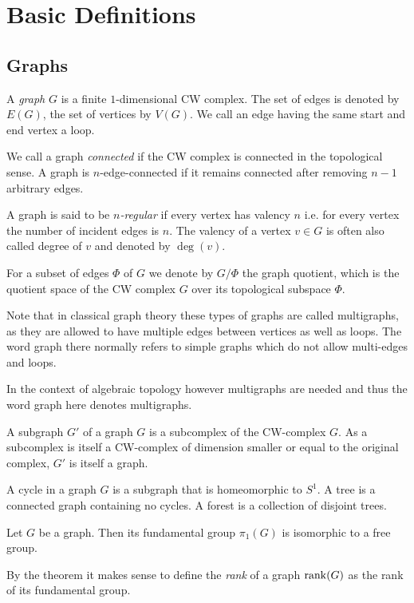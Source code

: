 \section{Basic Definitions}
\subsection{Graphs}
\begin{definition}
	A \emph{graph} $G$ is a finite $1$-dimensional CW complex. The set of edges is denoted by $E(G)$, the set of vertices by  $V(G)$.
	We call an edge having the same start and end vertex a loop.

	We call a graph \emph{connected} if the CW complex is connected in the topological sense.
	A graph is $n$-edge-connected if it remains connected after removing  $n-1$ arbitrary edges.

	A graph is said to be \emph{$n$-regular} if every vertex has valency $n$ i.e. for every vertex the number of incident edges is $n$.
	The valency of a vertex $v \in G$ is often also called degree of $v$ and denoted by $\deg(v)$.

	For a subset of edges $\Phi$ of $G$ we denote by $G / \Phi$ the graph quotient, which is the quotient space of the CW complex $G$ over its topological subspace $\Phi$.
\end{definition}

\begin{remark}
	Note that in classical graph theory these types of graphs are called multigraphs, as they are allowed to have multiple edges between vertices as well as loops.
	The word graph there normally refers to simple graphs which do not allow multi-edges and loops.

	In the context of algebraic topology however multigraphs are needed and thus the word graph here denotes multigraphs.
\end{remark}

\begin{definition}
	A subgraph $G'$ of a graph $G$ is a subcomplex of the CW-complex $G$. As a subcomplex is itself a CW-complex of dimension smaller or equal to the original complex,
	 $G'$ is itself a graph.

	A cycle in a graph $G$ is a subgraph that is homeomorphic to $S^1$. A tree is a
	connected graph containing no cycles. A forest is a collection of disjoint trees.
\end{definition}

\begin{theorem}\label{thm:fg_graph}
	Let $G$ be a graph. Then its fundamental group $\pi_{1}(G)$ is isomorphic to a free group.
\end{theorem}
By the theorem it makes sense to define the \emph{rank} of a graph $\rank(G)$ as the rank of its fundamental group.

